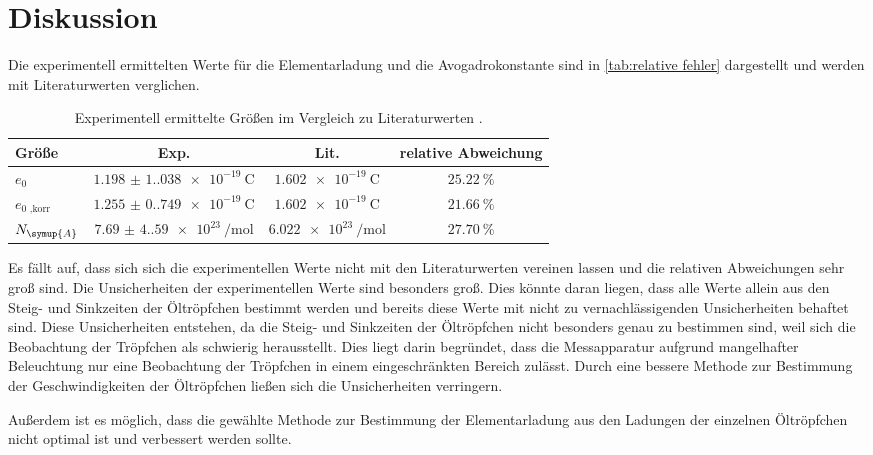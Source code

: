 \section{Diskussion}
\label{sec:Diskussion}
Die experimentell ermittelten Werte für die Elementarladung und die Avogadrokonstante sind in \autoref{tab:relative fehler} dargestellt
und werden mit Literaturwerten verglichen.
\begin{table}[H]
    \centering
    \caption{Experimentell ermittelte Größen im Vergleich zu Literaturwerten \cite{czichos}.}
    \label{tab:relative fehler}
    \begin{tabular}{l S S S}
        \toprule
        {Größe} & {Exp.} & {Lit.} & {relative Abweichung} \\
        \midrule
        {$e_0$}                 & $\qty{1.198(1.038)e-19}{\coulomb}$    & $\qty{1,602e-19}{\coulomb}$        & $\qty{25,22}{\percent}$ \\
        {$e_{0\text{ ,korr}}$}  & $\qty{1.255(0.749)e-19}{\coulomb}$    & $\qty{1,602e-19}{\coulomb}$        & $\qty{21,66}{\percent}$ \\
        {$N_{\symup{A}}$}       & $\qty{7.69(4.59)e23}{\per\mol}$       & $\qty{6,022e23}{\per\mol}$         & $\qty{27,70}{\percent}$ \\
        \bottomrule
    \end{tabular}
  \end{table}
Es fällt auf, dass sich sich die experimentellen Werte nicht mit den Literaturwerten vereinen lassen und die relativen Abweichungen 
sehr groß sind. Die Unsicherheiten der experimentellen Werte sind besonders groß. Dies könnte daran liegen, dass alle Werte allein aus den
Steig- und Sinkzeiten der Öltröpfchen bestimmt werden und bereits diese Werte mit nicht zu vernachlässigenden Unsicherheiten
behaftet sind. Diese Unsicherheiten entstehen, da die Steig- und Sinkzeiten der Öltröpfchen nicht besonders genau zu bestimmen sind, weil
sich die Beobachtung der Tröpfchen als schwierig herausstellt. Dies liegt darin begründet, dass die Messapparatur aufgrund mangelhafter
Beleuchtung nur eine Beobachtung der Tröpfchen in einem eingeschränkten Bereich zulässt.
Durch eine bessere Methode zur Bestimmung der Geschwindigkeiten der Öltröpfchen ließen sich die Unsicherheiten verringern.

Außerdem ist es möglich, dass die gewählte Methode zur Bestimmung der Elementarladung aus den Ladungen der einzelnen Öltröpfchen nicht optimal
ist und verbessert werden sollte.